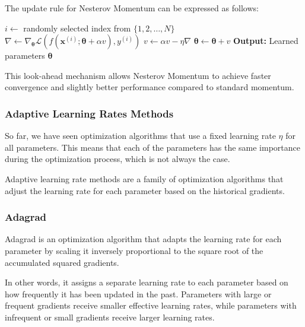 The update rule for Nesterov Momentum can be expressed as follows:
\begin{algorithm}[H]
    \caption{Stochastic Gradient Descent with Nesterov Momentum}
    \begin{algorithmic}[1]
            \State $i \leftarrow$ randomly selected index from $\{1, 2, \ldots, N\}$
            \State $\nabla \leftarrow \nabla_{\boldsymbol{\theta}} \mathcal{L}(f(\boldsymbol{x}^{(i)}; \boldsymbol{\theta} + \alpha v), y^{(i)})$
            \State $v \leftarrow \alpha v - \eta \nabla$
            \State $\boldsymbol{\theta} \leftarrow \boldsymbol{\theta} + v$
        \EndWhile
        \State \textbf{Output:} Learned parameters $\boldsymbol{\theta}$
    \end{algorithmic}
\end{algorithm}
This look-ahead mechanism allows Nesterov Momentum to achieve faster convergence and slightly better 
performance compared to standard momentum.

\subsubsection{Adaptive Learning Rates Methods}
So far, we have seen optimization algorithms that use a fixed learning rate $\eta$ for all parameters. This means that
each of the parameters has the same importance during the optimization process, which is not always the case.

Adaptive learning rate methods are a family of optimization algorithms that adjust the learning rate for each parameter based on the historical gradients.
\subsubsection*{Adagrad}
Adagrad is an optimization algorithm that adapts the learning rate for each parameter by scaling 
it inversely proportional to the square root of the accumulated squared gradients.

In other words, it assigns a separate learning rate to each parameter based on how 
frequently it has been updated in the past. 
Parameters with large or frequent gradients receive smaller effective learning rates, 
while parameters with infrequent or small gradients receive larger learning rates.

